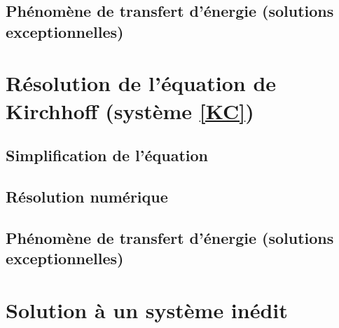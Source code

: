\documentclass[11pt,a4paper]{article}
\begin{document}

    \subsection{Phénomène de transfert d'énergie (solutions exceptionnelles)}
\section{Résolution de l'équation de Kirchhoff (système \eqref{KC})}
    \subsection{Simplification de l'équation}
    \subsection{Résolution numérique}
    \subsection{Phénomène de transfert d'énergie (solutions exceptionnelles)}

\section{Solution à un système inédit}
\end{document}
